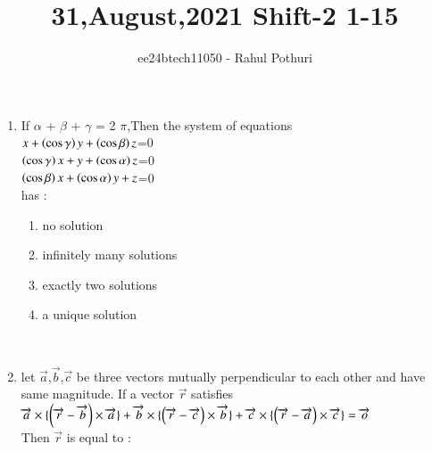 \documentclass[journal,12pt,twocolumn]{IEEEtran}
\theoremstyle{remark}
\begin{document}

\vspace{3cm}
\title{31,August,2021 Shift-2 1-15}
\author{ee24btech11050 - Rahul Pothuri}
\maketitle
\newpage
\bigskip
\renewcommand{\thefigure}{\theenumi}
\renewcommand{\thetable}{\theenumi}

\begin{enumerate}[start=1]
\item %
If $\alpha$ + $\beta$ + $\gamma$ = 2 $\pi$,Then the system of equations \\
$x+\left(\cos{\gamma}\right)y+\left(\cos{\beta}\right)z$=0 \\
$\left(\cos{\gamma}\right)x+y+\left(\cos{\alpha}\right)z$=0 \\
$\left(\cos{\beta}\right)x+\left(\cos{\alpha}\right)y+z$=0 \\
has :
\begin{enumerate}
\item no solution
\item infinitely many solutions
\item exactly two solutions
\item a unique solution
\end{enumerate}
\\


\item %
let $\overrightarrow{a}$,$\overrightarrow{b}$,$\overrightarrow{c}$ be three vectors mutually perpendicular to each other and have same magnitude. If a vector $\overrightarrow{r}$ satisfies \\
$\overrightarrow{a} \times \{\left(\overrightarrow{r}-\overrightarrow{b}\right)\times\overrightarrow{a}\}+\overrightarrow{b} \times \{\left(\overrightarrow{r}-\overrightarrow{c}\right)\times\overrightarrow{b}\}+\overrightarrow{c} \times \{\left(\overrightarrow{r}-\overrightarrow{a}\right)\times\overrightarrow{c}\} = \overrightarrow{o}$ \\
Then $\overrightarrow{r}$ is equal to : \\
\begin{enumerate}
\end{enumerate}
\begin{enumerate}
\end{enumerate}
\\


\end{enumerate}
\end{document}
